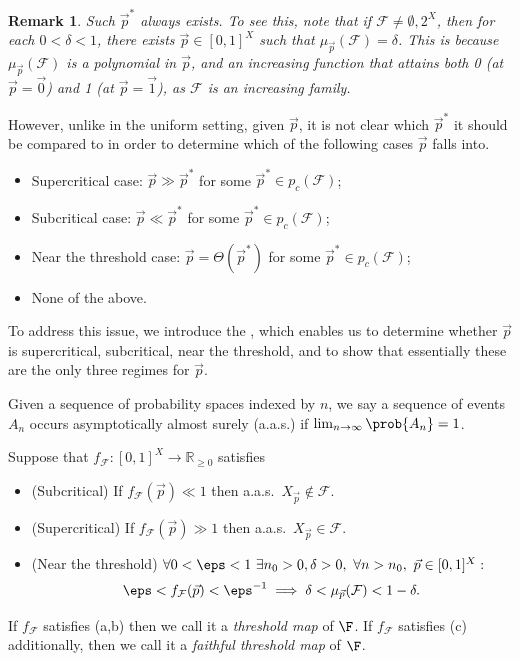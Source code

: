 \documentclass[12pt]{article}
\newtheorem*{remark*}{Remark}
\begin{document}
\begin{remark*}
\normalfont
Such $\vec{p}^*$ always exists. To see this, note that if $\mathcal{F}\neq\emptyset, 2^X$, then for each $0 < \delta < 1$, there exists $\vec{p}\in [0,1]^X$ such that $\mu_{\vec{p}}\left(\mathcal{F}\right) = \delta$. This is because $\mu_{\vec{p}}\left(\mathcal{F}\right)$ is a polynomial in $\vec{p}$, and an increasing function that attains both 0 (at $\vec{p}=\vec{0}$) and 1 (at $\vec{p}=\vec{1}$), as $\mathcal{F}$ is an increasing family.    
\end{remark*}

However, unlike in the uniform setting, given $\vec{p}$, it is not clear which $\vec{p}^*$ it should be compared to in order to determine which of the following cases $\vec{p}$ falls into.
\begin{itemize}
    \item Supercritical case: $\vec{p}\gg \vec{p}^*$ for some $\vec{p}^*\in p_c({\mathcal F})$;
    \item Subcritical case: $\vec{p}\ll \vec{p}^*$ for some $\vec{p}^*\in p_c({\mathcal F})$; 
    \item Near the threshold case: $\vec{p}=\Theta( \vec{p}^*)$ for some $\vec{p}^*\in p_c({\mathcal F})$;
    \item None of the above.
\end{itemize}

To address this issue, we introduce the , which enables us to determine whether $\vec{p}$ is supercritical, subcritical, near the threshold, and to show that essentially these are the only three regimes for $\vec{p}$. 


 Given a sequence of probability spaces indexed by $n$, we say a sequence of events $A_n$ occurs asymptotically almost surely (a.a.s.) if $\lim_{n\to\infty} \prob{A_n}=1$.

\begin{definition}\label{def:threshold}
Suppose that $f_{\mathcal{F}}:[0,1]^X\to {\mathbb R}_{\ge 0}$ satisfies
\begin{itemize}
    \item[(a)] (Subcritical) If $f_{\mathcal{F}}(\vec{p})\ll 1$ then a.a.s.\ $X_{\vec{p}}\notin\mathcal{F}$.

    \item[(b)] (Supercritical) If $f_{\mathcal{F}}(\vec{p})\gg 1$ then a.a.s.\ $X_{\vec{p}}\in\mathcal{F}$.
\item[(c)] (Near the threshold)
$\forall 0<\eps<1\ \exists n_0>0, \delta>0,\ \forall n>n_0,\ \vec{p}\in [0,1]^{X}:$
$$
\eps<f_{\mathcal{F}}(\vec{p})<\eps^{-1} \implies \delta<\mu_{\vec{p}}(\mathcal{F})<1-\delta.
$$
\end{itemize}
If $f_{\mathcal{F}}$ satisfies (a,b) then we call it a {\em threshold map} of $\F$. If $f_{\mathcal{F}}$ satisfies (c) additionally, then we call it a {\em faithful threshold map} of $\F$.
\end{definition}
\end{document}
